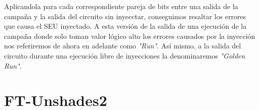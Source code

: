 
Aplicandola para cada correspondiente pareja de bits entre una salida de la 
campaña y la salida del circuito sin inyecctar, conseguimos resaltar los errores
que causa el \gls{SEU} inyectado. A esta versión de la salida de una ejecución de
la campaña donde solo toman valor lógico alto los errores causados por la
inyección nos referiremos de ahora en adelante como \textit{"Run"}. Así mismo, a 
la salida del circuito durante una ejecución libre de inyecciones la denominaremos
\textit{"Golden Run"}.







\section{FT-Unshades2}
\label{sec:FT-Unshades2}

\endinput
